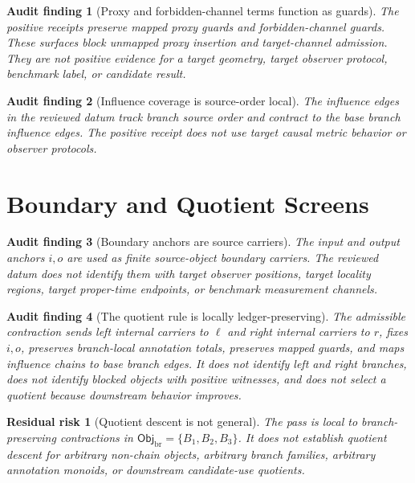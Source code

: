 \documentclass[11pt]{article}
\newcommand{\ObjBr}{\mathsf{Obj}_{\mathrm{br}}}
\newtheorem{auditfinding}{Audit finding}
\newtheorem{residualrisk}{Residual risk}
\begin{document}
\begin{auditfinding}[Proxy and forbidden-channel terms function as guards]
The positive receipts preserve mapped proxy guards and
forbidden-channel guards. These surfaces block unmapped proxy insertion
and target-channel admission. They are not positive evidence for a target
geometry, target observer protocol, benchmark label, or candidate result.
\end{auditfinding}

\begin{auditfinding}[Influence coverage is source-order local]
The influence edges in the reviewed datum track branch source order and
contract to the base branch influence edges. The positive receipt does
not use target causal metric behavior or observer protocols.
\end{auditfinding}

\section{Boundary and Quotient Screens}

\begin{auditfinding}[Boundary anchors are source carriers]
The input and output anchors \(i,o\) are used as finite source-object
boundary carriers. The reviewed datum does not identify them with target
observer positions, target locality regions, target proper-time
endpoints, or benchmark measurement channels.
\end{auditfinding}

\begin{auditfinding}[The quotient rule is locally ledger-preserving]
The admissible contraction sends left internal carriers to \(\ell\) and
right internal carriers to \(r\), fixes \(i,o\), preserves branch-local
annotation totals, preserves mapped guards, and maps influence chains to
base branch edges. It does not identify left and right branches, does not
identify blocked objects with positive witnesses, and does not select a
quotient because downstream behavior improves.
\end{auditfinding}

\begin{residualrisk}[Quotient descent is not general]
The pass is local to branch-preserving contractions in
\(\ObjBr=\{B_{1},B_{2},B_{3}\}\). It does not establish quotient descent
for arbitrary non-chain objects, arbitrary branch families, arbitrary
annotation monoids, or downstream candidate-use quotients.
\end{residualrisk}
\end{document}
